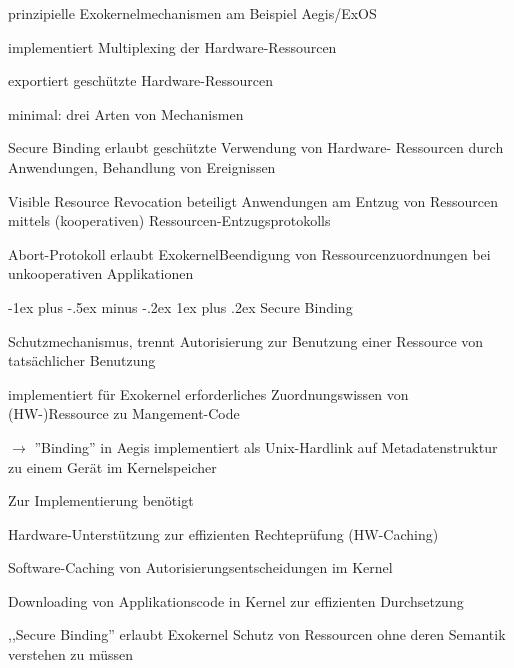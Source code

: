 \documentclass[a4paper]{article}
\makeatletter
\renewcommand{\subsubsection}{\@startsection{subsubsection}{3}{0mm}%
 {-1ex plus -.5ex minus -.2ex}%
 {1ex plus .2ex}%
 {\normalfont\small\bfseries}}
\makeatother
\begin{document}
\begin{multicols}{3}
\begin{itemize*}
\begin{itemize*}
        \end{itemize*}
        \item prinzipielle Exokernelmechanismen am Beispiel Aegis/ExOS
        \begin{description*}
            \item[implementiert] Multiplexing der Hardware-Ressourcen
            \item[exportiert] geschützte Hardware-Ressourcen
        \end{description*}
        \item minimal: drei Arten von Mechanismen
    \end{itemize*}
    \begin{description*}
        \item[Secure Binding] erlaubt geschützte Verwendung von Hardware- Ressourcen durch Anwendungen, Behandlung von Ereignissen
        \item[Visible Resource Revocation] beteiligt Anwendungen am Entzug von Ressourcen mittels (kooperativen) Ressourcen-Entzugsprotokolls
        \item[Abort-Protokoll] erlaubt ExokernelBeendigung von Ressourcenzuordnungen bei unkooperativen Applikationen
    \end{description*}


    \subsubsection{Secure Binding}
    \begin{itemize*}
        \item Schutzmechanismus, trennt Autorisierung zur Benutzung einer Ressource von tatsächlicher Benutzung
        \item implementiert für Exokernel erforderliches Zuordnungswissen von (HW-)Ressource zu Mangement-Code
        \item $\rightarrow$ ''Binding'' in Aegis implementiert als Unix-Hardlink auf Metadatenstruktur zu einem Gerät im Kernelspeicher
        \item Zur Implementierung benötigt
        \begin{itemize*}
            \item Hardware-Unterstützung zur effizienten Rechteprüfung (HW-Caching)
            \item Software-Caching von Autorisierungsentscheidungen im Kernel
            \item Downloading von Applikationscode in Kernel zur effizienten Durchsetzung
        \end{itemize*}
        \item ,,Secure Binding'' erlaubt Exokernel Schutz von Ressourcen ohne deren Semantik verstehen zu müssen
    \end{itemize*}


\end{multicols}
\end{document}
